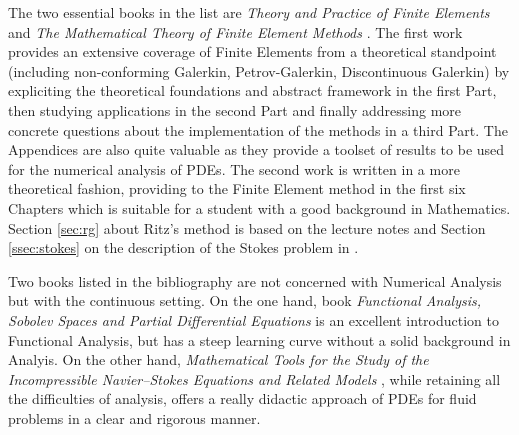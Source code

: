 The two essential books in the list are \textit{Theory and {P}ractice of {F}inite {E}lements} \cite{EG} and \textit{The {M}athematical {T}heory of {F}inite {E}lement {M}ethods} \cite{BS}.
The first work provides an extensive coverage of Finite Elements from a theoretical standpoint (including non-conforming Galerkin, Petrov-Galerkin, Discontinuous Galerkin) by expliciting the theoretical foundations and abstract framework in the first Part, then studying applications in the second Part and finally addressing more concrete questions about the implementation of the methods in a third Part. The Appendices are also quite valuable as they provide a toolset of results to be used for the numerical analysis of PDEs.
The second work is written in a more theoretical fashion, providing  to the Finite Element method in the first six Chapters which is suitable for a student with a good background in Mathematics.
Section \ref{sec:rg} about Ritz's method is based on the lecture notes \cite{RH} and Section \ref{ssec:stokes} on the description of the Stokes problem in \cite{JCL}.

Two books listed in the bibliography are not concerned with Numerical Analysis but with the continuous setting.
On the one hand, book \textit{Functional {A}nalysis, {S}obolev {S}paces and {P}artial {D}ifferential {E}quations} \cite{Brezis} is an excellent introduction to Functional Analysis, but has a steep learning curve without a solid background in Analyis.
On the other hand, \textit{Mathematical {T}ools for the {S}tudy of the {I}ncompressible {N}avier--Stokes {E}quations and {R}elated {M}odels} \cite{BF}, while retaining all the difficulties of analysis, offers a really didactic approach of PDEs for fluid problems in a clear and rigorous manner.
